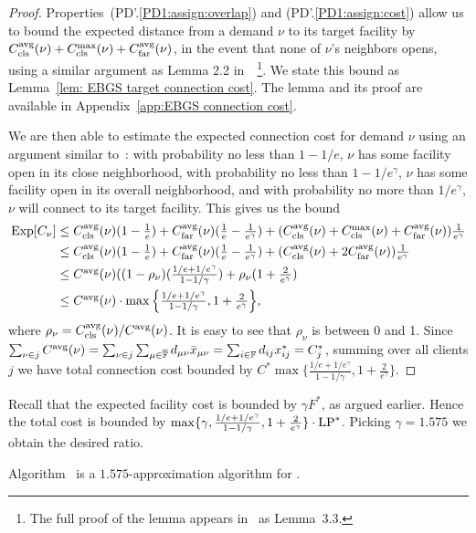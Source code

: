 \begin{proof}
  Properties~(PD'.\ref{PD1:assign:overlap}) and
  (PD'.\ref{PD1:assign:cost}) allow us to bound the expected distance
  from a demand $\nu$ to its target facility by
  $C_{\text{cls}}^{{\mbox{\scriptsize\rm avg}}}(\nu)+C_{\text{cls}}^{\max}(\nu)+C_{\text{far}}^{{\mbox{\scriptsize\rm avg}}}(\nu)$, in the event that none
  of $\nu$'s neighbors opens, using a similar argument as Lemma 2.2
  in~\cite{ByrkaGS10}~\footnote{The full proof of the lemma appears
    in~\cite{ByrkaA10} as Lemma~3.3.}. We state this bound as
  Lemma~\ref{lem: EBGS target connection cost}. The lemma and its
  proof are available in Appendix~\ref{app:EBGS connection cost}.

  We are then able to estimate the expected connection cost for demand
  $\nu$ using an argument similar to~\cite{ByrkaGS10}: with
  probability no less than $1-1/e$, $\nu$ has some facility open in
  its close neighborhood, with probability no less than
  $1-1/e^\gamma$, $\nu$ has some facility open in its overall
  neighborhood, and with probability no more than $1/e^\gamma$, $\nu$
  will connect to its target facility.  This gives us the bound
%
\begin{align*}
  \mbox{\rm Exp}[C_{\nu}] &\leq 
	\textstyle 
	C_{\text{cls}}^{{\mbox{\scriptsize\rm avg}}}(\nu)(1-\frac{1}{e}) + C_{\text{far}}^{{\mbox{\scriptsize\rm avg}}}(\nu)(\frac{1}{e}-\frac{1}{e^\gamma}) 
					+ (C_{\text{cls}}^{{\mbox{\scriptsize\rm avg}}}(\nu)+C_{\text{cls}}^{\max}(\nu)+C_{\text{far}}^{{\mbox{\scriptsize\rm avg}}}(\nu))\frac{1}{e^\gamma}
\\
  &\leq 
	\textstyle
	C_{\text{cls}}^{{\mbox{\scriptsize\rm avg}}}(\nu)(1-\frac{1}{e}) + C_{\text{far}}^{{\mbox{\scriptsize\rm avg}}}(\nu)(\frac{1}{e}-\frac{1}{e^\gamma})
	 			+ (C_{\text{cls}}^{{\mbox{\scriptsize\rm avg}}}(\nu)+2C_{\text{far}}^{{\mbox{\scriptsize\rm avg}}}(\nu))\frac{1}{e^\gamma}
\\
  &\leq
	\textstyle
  C^{{\mbox{\scriptsize\rm avg}}}(\nu)((1-\rho_{\nu})(\frac{1/e+1/e^\gamma}{1-1/\gamma})
  + \rho_{\nu}(1+\frac{2}{e^\gamma}) 
\\
  &\leq 
	\textstyle
	C^{{\mbox{\scriptsize\rm avg}}}(\nu) \cdot \max\Big\{\frac{1/e+1/e^\gamma}{1-1/\gamma},
  								1+\frac{2}{e^\gamma}\Big\},
\end{align*}
%
where $\rho_{\nu}=C_{\text{cls}}^{{\mbox{\scriptsize\rm avg}}}(\nu)/C^{{\mbox{\scriptsize\rm avg}}}(\nu)$. It is easy
to see that $\rho_{\nu}$ is between 0 and 1.
Since $\sum_{\nu\in j} C^{{\mbox{\scriptsize\rm avg}}}(\nu) = \sum_{\nu\in
  j}\sum_{\mu\in\overline{\mathbb{F}}} d_{\mu\nu}{\bar x}_{\mu\nu} =
\sum_{i\in\mathbb{F}} d_{ij}x_{ij}^\ast = C_j^\ast$, summing
over all clients $j$ we have total connection cost bounded
by $C^\ast \max\{\frac{1/e+1/e^\gamma}{1-1/\gamma},
1+\frac{2}{e^\gamma}\}$. 
\end{proof}

Recall that the expected facility cost is bounded by $\gamma F^\ast$,
as argued earlier. Hence the total cost is bounded by $\max\{\gamma,
\frac{1/e+1/e^\gamma}{1-1/\gamma}, 1+\frac{2}{e^\gamma}\}\cdot
\mbox{\rm LP}^\ast$. Picking $\gamma=1.575$ we obtain the desired ratio.


\begin{theorem}\label{thm:ebgs}
  Algorithm~{\EBGS} is a $1.575$-approximation algorithm for \FTFP.
\end{theorem}



